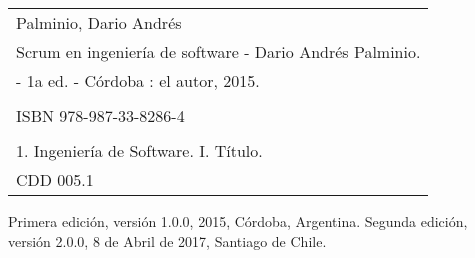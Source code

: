 
\newpage



\begin{table}
\centering
    \begin{tabular}{|l|}
    \hline
    {\small Palminio, Dario Andrés} \\   
    {\small Scrum en ingeniería de software - Dario Andrés Palminio.} \\ 
    {\small - 1a ed. -  Córdoba : el autor, 2015.}
         \\ \\   
         {\small ISBN 978-987-33-8286-4 } \\ \\   
         {\small 1. Ingeniería de Software. I. Título.}  \\   
         {\small CDD 005.1}  \\ \hline
    \end{tabular}
\end{table}


Primera edición, versión 1.0.0, 2015, Córdoba, Argentina.
Segunda edición, versión 2.0.0, 8 de Abril de 2017, Santiago de Chile.


